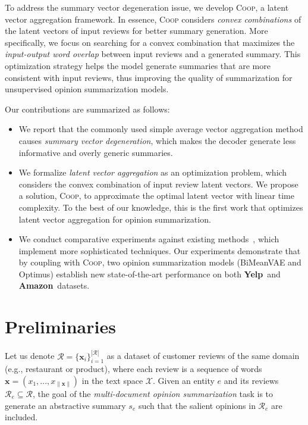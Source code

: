 \documentclass[11pt]{article}
\newcommand{\aggname}{\textsc{Coop}}
\newcommand{\name}{\mbox{\sc BiMeanVAE}}
\newcommand{\yelp}{\mbox{\bf Yelp}}
\newcommand{\amazon}{\mbox{\bf Amazon}}
\begin{document}
To address the summary vector degeneration issue,
we develop \aggname{}, a latent vector aggregation framework.
In essence, \aggname{} considers {\it convex combinations} of the latent vectors of input reviews for better summary generation. More specifically, we focus on searching for a convex combination that maximizes the {\it input-output word overlap} between input reviews and a generated summary. This optimization strategy helps the model generate summaries that are more consistent with input reviews, thus improving the quality of summarization for unsupervised opinion summarization models.

Our contributions are summarized as follows:
\begin{itemize}
  \setlength{\parskip}{0cm}
  \setlength{\itemsep}{0cm}
  \item We report that the commonly used simple average vector aggregation method causes {\em summary vector degeneration}, which makes the decoder generate less informative and overly generic summaries.\item We formalize \textit{latent vector aggregation} as an optimization problem, which considers the convex combination of input review latent vectors. We propose a solution, \aggname{}, to approximate the optimal latent vector with linear time complexity. To the best of our knowledge, this is the first work that optimizes latent vector aggregation for opinion summarization.
  \item We conduct comparative experiments against existing methods~\cite{Chu:2019:MeanSum, brazinskas-etal-2020-unsupervised}, which implement more sophisticated techniques. Our experiments demonstrate that by coupling with \aggname{}, two opinion summarization models (\name{} and Optimus) establish  new \mbox{state-of-the-art} performance on both \yelp\ and \amazon\ datasets.
\end{itemize}

\section{Preliminaries}\label{sec:preliminary}
Let us denote $\mathcal{R}=\{\boldsymbol{x}_i\}_{i=1}^{|\mathcal{R}|}$ as a dataset of customer reviews of the same domain (e.g., restaurant or product), where each
review is a sequence of words $\boldsymbol{x}=(x_1, ..., x_{\|\boldsymbol{x}\|})$ in the text space $\mathcal{X}$. Given an entity $e$ and its reviews $\mathcal{R}_e\subseteq \mathcal{R}$, the goal of the \textit{multi-document opinion summarization} task is to generate an abstractive summary $s_e$ such that the salient opinions in $\mathcal{R}_e$ are included.
\end{document}
